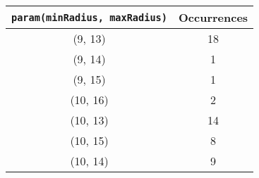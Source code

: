 \documentclass[letterpaper, 12pt]{article}
\begin{document}
\begin{longtable}{|c|c|}
\hline
\textbf{\texttt{param(minRadius, maxRadius)}} & \textbf{Occurrences} \\
\hline
(9, 13) & 18 \\
\hline
(9, 14) & 1 \\
\hline
(9, 15) & 1 \\
\hline
(10, 16) & 2 \\
\hline
(10, 13) & 14 \\
\hline
(10, 15) & 8 \\
\hline
(10, 14) & 9 \\
\hline
\end{longtable}
\end{document}

